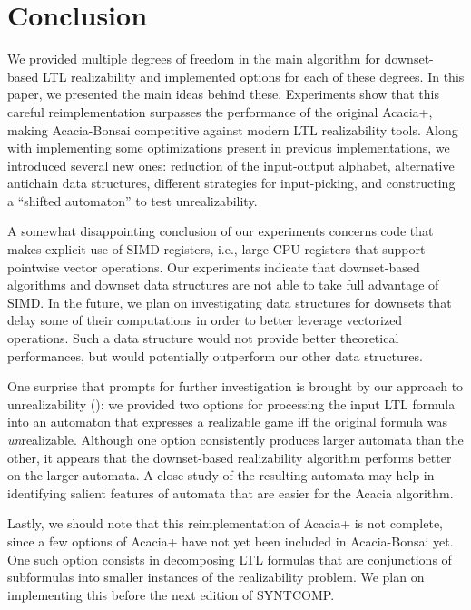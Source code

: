 \documentclass[runningheads,a4paper]{llncs}
\begin{document}
\section{Conclusion}

We provided multiple degrees of freedom in the main algorithm for downset-based
LTL realizability and implemented options for each of these degrees.  In this
paper, we presented the main ideas behind these.  Experiments show that this
careful reimplementation surpasses the performance of the original Acacia+,
making Acacia-Bonsai competitive against modern LTL realizability tools.  Along
with implementing some optimizations present in previous implementations, we
introduced several new ones: reduction of the input-output alphabet, alternative
antichain data structures, different strategies for input-picking, and
constructing a ``shifted automaton'' to test unrealizability.

A somewhat disappointing conclusion of our experiments concerns code that makes
explicit use of SIMD registers, i.e., large CPU registers that support pointwise
vector operations.  Our experiments indicate that downset-based algorithms and
downset data structures are not able to take full advantage of SIMD.  In the
future, we plan on investigating data structures for downsets that delay some of
their computations in order to better leverage vectorized operations.  Such a
data structure would not provide better theoretical performances, but would
potentially outperform our other data structures.

One surprise that prompts for further investigation is brought by our approach
to unrealizability (): we provided two options for processing
the input LTL formula into an automaton that expresses a realizable game iff the
original formula was \emph{un}realizable.  Although one option consistently
produces larger automata than the other, it appears that the downset-based
realizability algorithm performs better on the larger automata.  A close study
of the resulting automata may help in identifying salient features of automata
that are easier for the Acacia algorithm.

Lastly, we should note that this reimplementation of Acacia+ is not complete,
since a few options of Acacia+ have not yet been included in Acacia-Bonsai yet.
One such option consists in decomposing LTL formulas that are conjunctions of
subformulas into smaller instances of the realizability problem.  We plan on
implementing this before the next edition of SYNTCOMP.
\end{document}
